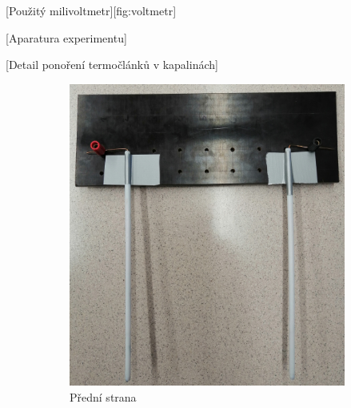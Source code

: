 [Použitý milivoltmetr][fig:voltmetr]

[Aparatura experimentu]

[Detail ponoření termočlánků v kapalinách]

\begin{figure}[htpb]
    \hfill
    \centering
    \begin{subfigure}{0.45\textwidth}
        \centering
        \includegraphics[width=0.95\linewidth]{figures/termoclanek_front.jpg}
        \caption{Přední strana}
    \end{subfigure}
    \hfill
    \begin{subfigure}{0.45\textwidth}
        \centering

\end{subfigure}
\end{figure}
